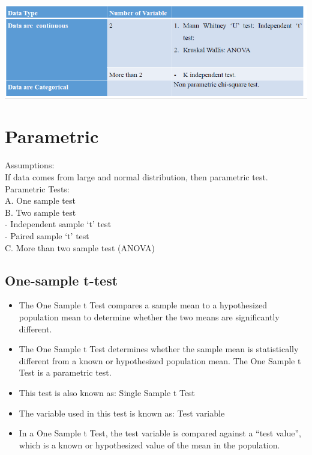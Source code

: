 \documentclass[
  letterpaper,
  DIV=11,
  numbers=noendperiod]{scrreprt}
\providecommand{\tightlist}{%
  \setlength{\itemsep}{0pt}\setlength{\parskip}{0pt}}\usepackage{longtable,booktabs,array}
\begin{document}
\includegraphics{images/non-para.png}

\section{Parametric}\label{parametric}

{Assumptions:}\\

If data comes from large and normal distribution, then parametric
test.\\

{Parametric Tests:}\\

A. One sample test\\
B. Two sample test\\
- Independent sample `t' test\\
- Paired sample `t' test\\
C. More than two sample test (ANOVA)\\

\subsection{One-sample t-test}\label{one-sample-t-test}

\begin{itemize}
\tightlist
\item
  The One Sample t Test compares a sample mean to a hypothesized
  population mean to determine whether the two means are significantly
  different.\\
\item
  The One Sample t Test determines whether the sample mean is
  statistically different from a known or hypothesized population mean.
  The One Sample t Test is a parametric test.\\
\item
  This test is also known as: {Single Sample t Test}\\
\item
  The variable used in this test is known as: {Test variable}\\
\item
  In a One Sample t Test, the test variable is compared against a ``test
  value'', which is a known or hypothesized value of the mean in the
  population.\\
\end{itemize}
\end{document}
